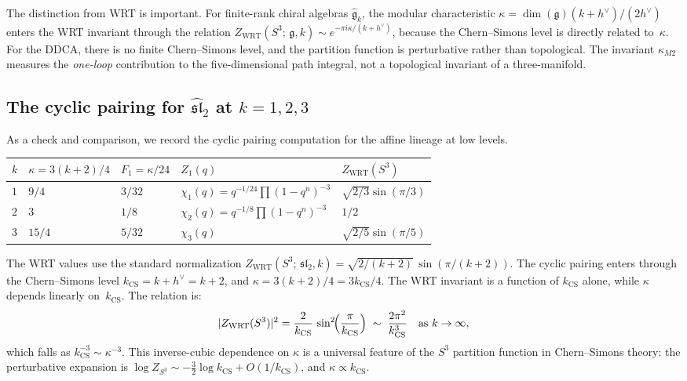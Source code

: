 \documentclass[11pt]{article}
\newcommand{\fg}{\mathfrak{g}}
\newcommand{\fsl}{\mathfrak{sl}}
\begin{document}
The distinction from WRT is important.  For finite-rank chiral
algebras $\widehat{\fg}_k$, the modular characteristic
$\kappa = \dim(\fg)(k + h^\vee)/(2h^\vee)$ enters the WRT
invariant through the relation
$Z_{\mathrm{WRT}}(S^3;\, \fg,k) \sim e^{-\pi i \kappa / (k+h^\vee)}$,
because the Chern--Simons level is directly related to~$\kappa$.
For the DDCA, there is no finite Chern--Simons level, and the
partition function is perturbative rather than topological.
The invariant $\kappa_{M2}$ measures the \emph{one-loop}
contribution to the five-dimensional path integral, not a
topological invariant of a three-manifold.

\subsection{The cyclic pairing for $\widehat{\fsl}_2$ at
$k = 1, 2, 3$}

As a check and comparison, we record the cyclic pairing
computation for the affine lineage at low levels.

\begin{center}
\renewcommand{\arraystretch}{1.3}
\begin{tabular}{lllll}
$k$ & $\kappa = 3(k+2)/4$ & $F_1 = \kappa/24$ &
$Z_1(q)$ & $Z_{\mathrm{WRT}}(S^3)$ \\
\hline
$1$ & $9/4$ & $3/32$ &
$\chi_1(q) = q^{-1/24}\prod(1-q^n)^{-3}$ &
$\sqrt{2/3}\sin(\pi/3)$ \\
$2$ & $3$ & $1/8$ &
$\chi_2(q) = q^{-1/8}\prod(1-q^n)^{-3}$ &
$1/2$ \\
$3$ & $15/4$ & $5/32$ &
$\chi_3(q)$ &
$\sqrt{2/5}\sin(\pi/5)$
\end{tabular}
\end{center}
The WRT values use the standard normalization
$Z_{\mathrm{WRT}}(S^3;\, \mathfrak{sl}_2, k)
= \sqrt{2/(k+2)}\,\sin(\pi/(k+2))$.
The cyclic pairing enters through the Chern--Simons level
$k_{\mathrm{CS}} = k + h^\vee = k + 2$, and
$\kappa = 3(k+2)/4 = 3k_{\mathrm{CS}}/4$.  The WRT
invariant is a function of $k_{\mathrm{CS}}$ alone, while
$\kappa$ depends linearly on~$k_{\mathrm{CS}}$.  The
relation is:
\begin{equation}\label{eq:kappa-wrt-sl2}
|Z_{\mathrm{WRT}}(S^3)|^2
= \frac{2}{k_{\mathrm{CS}}}\,\sin^2\!\Bigl(\frac{\pi}{k_{\mathrm{CS}}}\Bigr)
\;\sim\;
\frac{2\pi^2}{k_{\mathrm{CS}}^3}
\quad\text{as } k \to \infty,
\end{equation}
which falls as $k_{\mathrm{CS}}^{-3} \sim \kappa^{-3}$.  This
inverse-cubic dependence on $\kappa$ is a universal feature of
the $S^3$ partition function in Chern--Simons theory: the
perturbative expansion is
$\log Z_{S^3} \sim -\frac{3}{2}\log k_{\mathrm{CS}}
+ O(1/k_{\mathrm{CS}})$, and $\kappa \propto k_{\mathrm{CS}}$.
\end{document}
